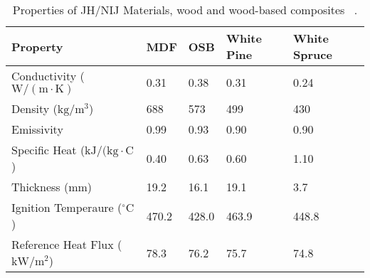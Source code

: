 \begin{table}[!h]
\caption[Properties of JH/NIJ Materials, wood and wood-based composites]{Properties of JH/NIJ Materials, wood and wood-based composites ~\cite{Lattimer:NIJ19}.}
\centering
\begin{tabular}{|l|p{1.4cm}|p{1.4cm}|p{1.4cm}|p{1.4cm}|}
\hline
Property                                       &   MDF     &   OSB     &  White Pine   &   White Spruce  \\ \hline
Conductivity        ($\mathrm{W/(m\cdot K)}$   &   0.31    &   0.38    &  0.31         &   0.24          \\ \hline
Density             ($\mathrm{kg/m^{3}}$)      &   688     &   573     &  499          &   430           \\ \hline
Emissivity                                     &   0.99    &   0.93    &  0.90         &   0.90          \\ \hline
Specific Heat       ($\mathrm{kJ/(kg\cdot C}$) &   0.40    &   0.63    &  0.60         &   1.10          \\ \hline
Thickness           ($\mathrm{mm}$)            &   19.2    &   16.1    &  19.1         &   3.7           \\ \hline
Ignition Temperaure ($\mathrm{^{\circ}C}$)     &   470.2   &   428.0   &  463.9        &   448.8         \\ \hline
Reference Heat Flux ($\mathrm{kW/m^{2}}$)      &   78.3    &   76.2    &  75.7         &   74.8          \\ \hline
\end{tabular}
\label{Properties_JH_NIJ_Materials_woods}
\end{table}


